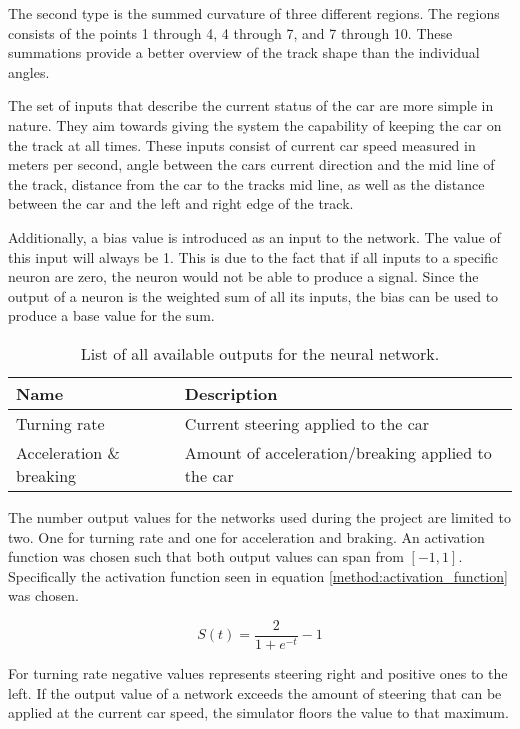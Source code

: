 The second type is the summed curvature of three different regions. The regions consists of the points 1 through 4, 4 through 7, and 7 through 10. These summations provide a better overview of the track shape than the individual angles. 

The set of inputs that describe the current status of the car are more simple in nature. They aim towards giving the system the capability of keeping the car on the track at all times. These inputs consist of current car speed measured in meters per second, angle between the cars current direction and the mid line of the track, distance from the car to the tracks mid line, as well as the distance between the car and the left and right edge of the track.

Additionally, a bias value is introduced as an input to the network. The value of this input will always be 1. This is due to the fact that if all inputs to a specific neuron are zero, the neuron would not be able to produce a signal. Since the output of a neuron is the weighted sum of all its inputs, the bias can be used to produce a base value for the sum. 

\begin{table}[h!] 
  \centering
  \begin{tabular}{ll}
    \toprule
    Name & Description\\
    \midrule
    Turning rate & Current steering applied to the car \\
    Acceleration \& breaking & Amount of acceleration/breaking applied to the car \\
    \bottomrule
  \end{tabular}
  \caption{List of all available outputs for the neural network.}
  \label{tab:output_table}
\end{table}

\noindent
The number output values for the networks used during the project are limited to two. One for turning rate and one for acceleration and braking. An activation function was chosen such that both output values can span from $[-1,1]$. Specifically the activation function seen in equation \ref{method:activation_function} was chosen.

\begin{equation}
\label{method:activation_function}
    S(t) = \frac{2}{1 + e^{-t}} - 1
\end{equation}

\noindent
For turning rate negative values represents steering right and positive ones to the left. If the output value of a network exceeds the amount of steering that can be applied at the current car speed, the simulator floors the value to that maximum.

